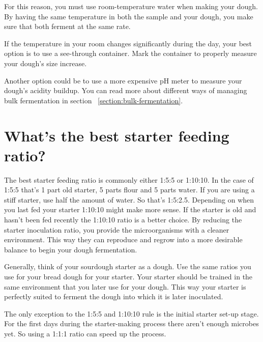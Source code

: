 For this reason, you must use room-temperature water when
making your dough. By having the same temperature in both the sample
and your dough, you make sure that both ferment at the same rate.

If the temperature in your room changes significantly during the day, your
best option is to use a see-through container. Mark the container to properly
measure your dough's size increase.

Another option could be to use a more expensive pH meter to measure your
dough's acidity buildup. You can read more about different ways of managing
bulk fermentation in section ~\ref{section:bulk-fermentation}.

\section{What's the best starter feeding ratio?}

The best starter feeding ratio is commonly either 1:5:5 or 1:10:10.
In the case of 1:5:5 that's 1 part old starter,
5 parts flour and 5 parts water. If you are using a stiff starter,
use half the amount of water. So that's 1:5:2.5. Depending on when
you last fed your starter 1:10:10 might make more sense. If the starter
is old and hasn't been fed recently the 1:10:10 ratio is a better choice.
By reducing the starter inoculation ratio, you provide the microorganisms
with a cleaner environment. This way they can reproduce and regrow
into a more desirable balance to begin your dough fermentation.

Generally, think of your sourdough starter as a dough. Use the same
ratios you use for your bread dough for your starter. Your starter
should be trained in the same environment that you later use
for your dough. This way your starter is perfectly suited to
ferment the dough into which it is later inoculated.

The only exception to the 1:5:5 and 1:10:10 rule is the initial
starter set-up stage. For the first days during the starter-making
process there aren't enough microbes yet. So using a 1:1:1 ratio
can speed up the process. 
